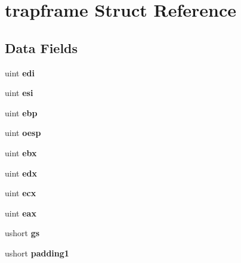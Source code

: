 \hypertarget{structtrapframe}{}\section{trapframe Struct Reference}
\label{structtrapframe}
\subsection*{Data Fields}
\begin{DoxyCompactItemize}
\item 
\mbox{\label{structtrapframe_ad20959553b558987a0d475b6367c87d0}} 
uint {\bfseries edi}
\item 
\mbox{\label{structtrapframe_a11cbc20a968f2ce7a9b71590a709bb46}} 
uint {\bfseries esi}
\item 
\mbox{\label{structtrapframe_a258f414f983f95f6799372d548fbd6d3}} 
uint {\bfseries ebp}
\item 
\mbox{\label{structtrapframe_a8466e7bcbbbe2d19fbe7f4fe0daa29fb}} 
uint {\bfseries oesp}
\item 
\mbox{\label{structtrapframe_a0f93026966ea52a69a94870fb394ba04}} 
uint {\bfseries ebx}
\item 
\mbox{\label{structtrapframe_a62585fbda8434a03de564611b89c02ad}} 
uint {\bfseries edx}
\item 
\mbox{\label{structtrapframe_ad42fe2bbc83c7fe778f0127ac038efa3}} 
uint {\bfseries ecx}
\item 
\mbox{\label{structtrapframe_ab1dd3a10936b61129d7395c3a21bc2fe}} 
uint {\bfseries eax}
\item 
\mbox{\label{structtrapframe_a3df62e3ed00405cbaaa4d72902c617da}} 
ushort {\bfseries gs}
\item 
\mbox{\label{structtrapframe_a84a5fbe43d7f11df983d97c80aabb454}} 
ushort {\bfseries padding1}
\item 
\mbox{\label{structtrapframe_a4791a272cca7213d324e59db2d9d0b71}} 

\end{DoxyCompactItemize}

